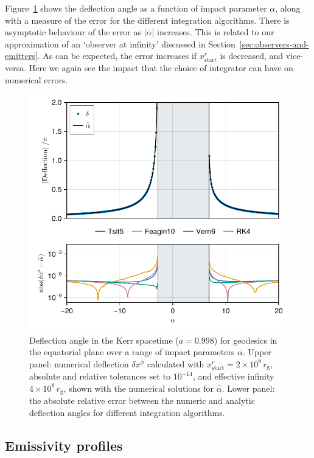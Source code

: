 \documentclass[fleqn,usenatbib]{mnras}
\newcommand{\rg}{r_\text{g}}
\begin{document}
Figure~\ref{fig:deflection-angle} shows the deflection angle as a function of
impact parameter $\alpha$, along with a  measure of the error for the different
integration algorithms. There is asymptotic behaviour of the error as $\lvert
\alpha \rvert$ increases. This is related to our approximation of an `observer
at infinity' discussed in Section~\ref{sec:observers-and-emitters}. As can be
expected, the error increases if $x^r_\text{start}$ is decreased, and
vice-versa. Here we again see the impact that the choice of integrator can have
on numerical errors.

\begin{figure}
    \centering
    \includegraphics[width=0.94\columnwidth]{figures/deflection.iyer-hansen.pdf}
    \caption{Deflection angle in the Kerr spacetime ($a = 0.998$) for geodesics
        in the equatorial plane over a range of impact parameters $\alpha$.
        Upper panel: numerical deflection $\delta x^\phi$ calculated with
        $x^r_\text{start} = 2 \times 10^8 \, \rg$, absolute and relative
        tolerances set to $10^{-14}$, and effective infinity $4 \times 10^8\,
        \rg$, shown with the numerical solutions for $\hat{\alpha}$. Lower
        panel: the absolute relative error between the numeric and analytic
        deflection angles for different integration algorithms.}
    \label{fig:deflection-angle}
\end{figure}

\subsection{Emissivity profiles}
\end{document}

